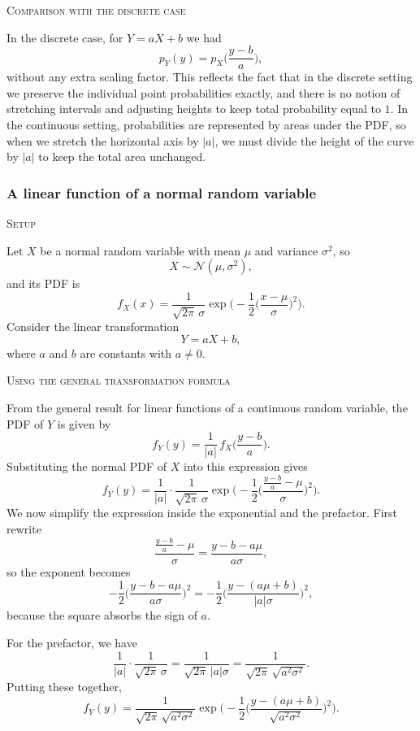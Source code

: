 \textsc{Comparison with the discrete case}

In the discrete case, for \(Y = aX + b\) we had
\[
p_Y(y)
=
p_X\Big(\frac{y - b}{a}\Big),
\]
without any extra scaling factor.  
This reflects the fact that in the discrete setting we preserve the individual point probabilities exactly, and there is no notion of stretching intervals and adjusting heights to keep total probability equal to \(1\).  
In the continuous setting, probabilities are represented by areas under the PDF, so when we stretch the horizontal axis by \(|a|\), we must divide the height of the curve by \(|a|\) to keep the total area unchanged.



\subsubsection{A linear function of a normal random variable}

\textsc{Setup}

Let \(X\) be a normal random variable with mean \(\mu\) and variance \(\sigma^{2}\), so
\[
X \sim \mathcal{N}(\mu,\sigma^{2}),
\]
and its PDF is
\[
f_{X}(x)
=
\frac{1}{\sqrt{2\pi}\,\sigma}
\exp\!\Bigg(
-\frac{1}{2}
\Bigg(
\frac{x-\mu}{\sigma}
\Bigg)^{2}
\Bigg).
\]
Consider the linear transformation
\[
Y = aX + b,
\]
where \(a\) and \(b\) are constants with \(a \neq 0\).  

\textsc{Using the general transformation formula}

From the general result for linear functions of a continuous random variable, the PDF of \(Y\) is given by
\[
f_{Y}(y)
=
\frac{1}{|a|}\,
f_{X}\Big(\frac{y-b}{a}\Big).
\]
Substituting the normal PDF of \(X\) into this expression gives
\[
f_{Y}(y)
=
\frac{1}{|a|}
\cdot
\frac{1}{\sqrt{2\pi}\,\sigma}
\exp\!\Bigg(
-\frac{1}{2}
\Bigg(
\frac{\frac{y-b}{a}-\mu}{\sigma}
\Bigg)^{2}
\Bigg).
\]
We now simplify the expression inside the exponential and the prefactor.  
First rewrite
\[
\frac{\frac{y-b}{a}-\mu}{\sigma}
=
\frac{y-b-a\mu}{a\sigma},
\]
so the exponent becomes
\[
-\frac{1}{2}
\Bigg(
\frac{y-b-a\mu}{a\sigma}
\Bigg)^{2}
=
-\frac{1}{2}
\Bigg(
\frac{y-(a\mu+b)}{|a|\sigma}
\Bigg)^{2},
\]
because the square absorbs the sign of \(a\).  

For the prefactor, we have
\[
\frac{1}{|a|}
\cdot
\frac{1}{\sqrt{2\pi}\,\sigma}
=
\frac{1}{\sqrt{2\pi}\,|a|\sigma}
=
\frac{1}{\sqrt{2\pi}\,\sqrt{a^{2}\sigma^{2}}}.
\]
Putting these together,
\[
f_{Y}(y)
=
\frac{1}{\sqrt{2\pi}\,\sqrt{a^{2}\sigma^{2}}}
\exp\!\Bigg(
-\frac{1}{2}
\Bigg(
\frac{y-(a\mu+b)}{\sqrt{a^{2}\sigma^{2}}}
\Bigg)^{2}
\Bigg).
\]

